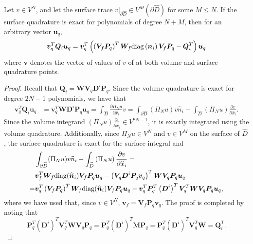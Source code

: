 \documentclass[review]{siamart0216}
\theoremstyle{assumption}
\renewcommand{\hat}[1]{\widehat{#1}}
\newcommand{\pd}[2]{\frac{\partial#1}{\partial#2}}
\newcommand{\LRp}[1]{\left( #1 \right)}
\newcommand{\LRl}[1]{\left. #1 \right|}
\newcommand{\diag}[1]{{\rm diag}\LRp{#1}}
\begin{document}
\begin{lemma}
Let $v\in V^N$, and let the surface trace $\LRl{v}_{\partial \hat{D}} \in V^M\LRp{\partial \hat{D}}$ for some $M \leq N$. If the surface quadrature is exact for polynomials of degree $N+M$,  then for an arbitrary vector $\bm{u}_q$, 
\[
\bm{v}_q^T\bm{Q}_i \bm{u}_q = \bm{v}_q^T\LRp{ \LRp{\bm{V}_f\bm{P}_q}^T \bm{W}_f \diag{{\bm{n}}_i}\bm{V}_f\bm{P}_q - \bm{Q}_i^T}\bm{u}_q
\]
where $\bm{v}$ denotes the vector of values of $v$ of at both volume and surface quadrature points. 
\label{lemma:vsbp}
\end{lemma}
\begin{proof}
Recall that $\bm{Q}_i = \bm{W} \bm{V}_q \bm{D}^i\bm{P}_q$.  Since the volume quadrature is exact for degree $2N-1$ polynomials, we have that
\begin{align*}
\bm{v}_q^T\bm{Q}_i \bm{u}_q &= \bm{v}_q^T\bm{W} \bm{D}^i \bm{P}_q \bm{u}_q = \int_{\hat{D}} \pd{\Pi_N u}{\hat{x}_i} v = \int_{\partial \hat{D}} (\Pi_N u) v \hat{n}_i - \int_{\hat{D}} \LRp{\Pi_N u} \pd{v}{\hat{x}_i}.
\end{align*}
Since the volume integrand $\LRp{\Pi_N u} \pd{v}{\hat{x}_i} \in V^{2N-1}$, it is exactly integrated using the volume quadrature.  Additionally, since $\Pi_N u \in V^N$ and $v\in V^M$ on the surface of $\hat{D}$, the surface quadrature is exact for the surface integral and 
\begin{align*}
&\int_{\partial \hat{D}} (\Pi_N u) v \hat{n}_i -   \int_{\hat{D}} \LRp{\Pi_N u} \pd{v}{\hat{x}_i} =\\
 &\bm{v}_f^T\bm{W}_f{\rm diag}(\hat{\bm{n}}_i) \bm{V}_f\bm{P}_q\bm{u}_q - \LRp{\bm{V}_q\bm{D}^i\bm{P}_q\bm{v}_q}^T\bm{W} \bm{V}_q\bm{P}_q\bm{u}_q\\
=& \bm{v}_q^T \LRp{\bm{V}_f\bm{P}_q}^T\bm{W}_f{\rm diag}(\hat{\bm{n}}_i) \bm{V}_f\bm{P}_q\bm{u}_q - \bm{v}_q^T \bm{P}_q^T\LRp{\bm{D}^i}^T \bm{V}_q^T \bm{W} \bm{V}_q\bm{P}_q\bm{u}_q,
\end{align*}
where we have used that, since $v\in V^N$, $\bm{v}_f = \bm{V}_f\bm{P}_q\bm{v}_q$.  The proof is completed by noting that 
\[
\bm{P}_q^T\LRp{\bm{D}^i}^T \bm{V}_q^T \bm{W} \bm{V}_q\bm{P}_q = \bm{P}_q^T\LRp{\bm{D}^i}^T \bm{M}\bm{P}_q = \bm{P}_q^T\LRp{\bm{D}^i}^T \bm{V}_q^T\bm{W} = \bm{Q}_i^T.
\]
\end{proof}
\end{document}
